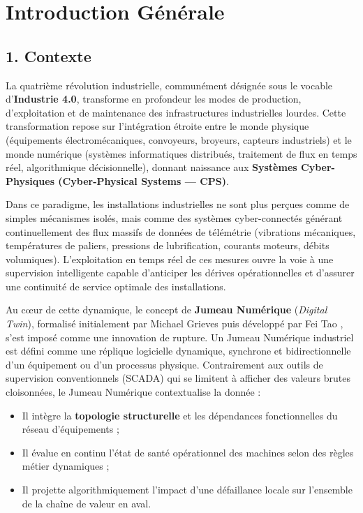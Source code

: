 ﻿\chapter*{Introduction Générale}

\section*{1. Contexte}
La quatrième révolution industrielle, communément désignée sous le vocable d'\textbf{Industrie 4.0}, transforme en profondeur les modes de production, d'exploitation et de maintenance des infrastructures industrielles lourdes. Cette transformation repose sur l'intégration étroite entre le monde physique (équipements électromécaniques, convoyeurs, broyeurs, capteurs industriels) et le monde numérique (systèmes informatiques distribués, traitement de flux en temps réel, algorithmique décisionnelle), donnant naissance aux \textbf{Systèmes Cyber-Physiques (Cyber-Physical Systems --- CPS)}.

Dans ce paradigme, les installations industrielles ne sont plus perçues comme de simples mécanismes isolés, mais comme des systèmes cyber-connectés générant continuellement des flux massifs de données de télémétrie (vibrations mécaniques, températures de paliers, pressions de lubrification, courants moteurs, débits volumiques). L'exploitation en temps réel de ces mesures ouvre la voie à une supervision intelligente capable d'anticiper les dérives opérationnelles et d'assurer une continuité de service optimale des installations.

Au cœur de cette dynamique, le concept de \textbf{Jumeau Numérique} (\textit{Digital Twin}), formalisé initialement par Michael Grieves \cite{grieves2014digital} puis développé par Fei Tao \cite{tao2019digital}, s'est imposé comme une innovation de rupture. Un Jumeau Numérique industriel est défini comme une réplique logicielle dynamique, synchrone et bidirectionnelle d'un équipement ou d'un processus physique. Contrairement aux outils de supervision conventionnels (SCADA) qui se limitent à afficher des valeurs brutes cloisonnées, le Jumeau Numérique contextualise la donnée :
\begin{itemize}
    \item Il intègre la \textbf{topologie structurelle} et les dépendances fonctionnelles du réseau d'équipements ;
    \item Il évalue en continu l'état de santé opérationnel des machines selon des règles métier dynamiques ;
    \item Il projette algorithmiquement l'impact d'une défaillance locale sur l'ensemble de la chaîne de valeur en aval.
\end{itemize}

